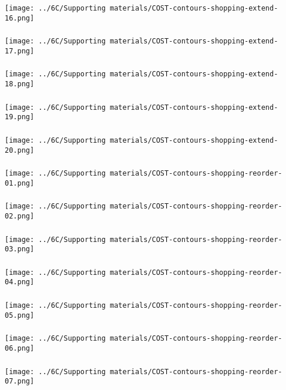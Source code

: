 \begin{frame}\frametitle{}
	\centerline{\texttt{[image: ../6C/Supporting materials/COST-contours-shopping-extend-16.png]}}
\end{frame}
\begin{frame}\frametitle{}
	\centerline{\texttt{[image: ../6C/Supporting materials/COST-contours-shopping-extend-17.png]}}
\end{frame}
\begin{frame}\frametitle{}
	\centerline{\texttt{[image: ../6C/Supporting materials/COST-contours-shopping-extend-18.png]}}
\end{frame}
\begin{frame}\frametitle{}
	\centerline{\texttt{[image: ../6C/Supporting materials/COST-contours-shopping-extend-19.png]}}
\end{frame}
\begin{frame}\frametitle{}
	\centerline{\texttt{[image: ../6C/Supporting materials/COST-contours-shopping-extend-20.png]}}
\end{frame}
\begin{frame}\frametitle{}
	\centerline{\texttt{[image: ../6C/Supporting materials/COST-contours-shopping-reorder-01.png]}}
\end{frame}
\begin{frame}\frametitle{}
	\centerline{\texttt{[image: ../6C/Supporting materials/COST-contours-shopping-reorder-02.png]}}
\end{frame}
\begin{frame}\frametitle{}
	\centerline{\texttt{[image: ../6C/Supporting materials/COST-contours-shopping-reorder-03.png]}}
\end{frame}
\begin{frame}\frametitle{}
	\centerline{\texttt{[image: ../6C/Supporting materials/COST-contours-shopping-reorder-04.png]}}
\end{frame}
\begin{frame}\frametitle{}
	\centerline{\texttt{[image: ../6C/Supporting materials/COST-contours-shopping-reorder-05.png]}}
\end{frame}
\begin{frame}\frametitle{}
	\centerline{\texttt{[image: ../6C/Supporting materials/COST-contours-shopping-reorder-06.png]}}
\end{frame}
\begin{frame}\frametitle{}
	\centerline{\texttt{[image: ../6C/Supporting materials/COST-contours-shopping-reorder-07.png]}}
\end{frame}
